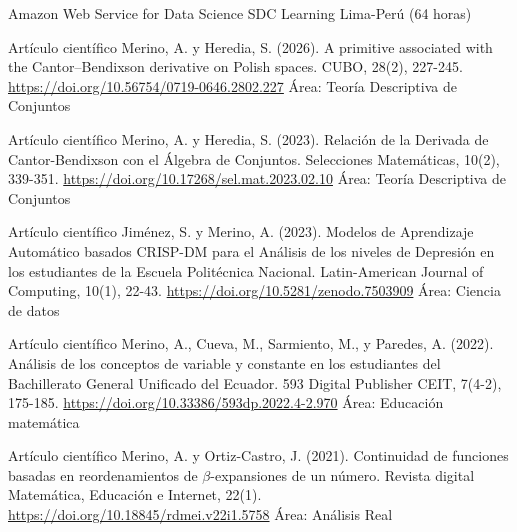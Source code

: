 \documentclass[
    a4paper,
    maincolor=cvblue!70!blue,
    sidecolor=gray!30,
    sectioncolor=cvblue!70!blue,
    sidebarwidth=7.5cm,
    topbottommargin=20pt,
    leftrightmargin=20pt,
]{fortysecondscv}
\begin{document}
    {Amazon Web Service for Data Science}
    {SDC Learning}
    {Lima-Perú (64 horas)}





    {Artículo científico}
    {Merino, A. y Heredia, S. (2026). A primitive associated with the Cantor–Bendixson derivative on Polish spaces. CUBO, 28(2), 227-245.}
    {\url{https://doi.org/10.56754/0719-0646.2802.227}}
    {Área: Teoría Descriptiva de Conjuntos}

    {Artículo científico}
    {Merino, A. y Heredia, S. (2023). Relación de la Derivada de Cantor-Bendixson con el Álgebra de Conjuntos. Selecciones Matemáticas, 10(2), 339-351.}
    {\url{https://doi.org/10.17268/sel.mat.2023.02.10}}
    {Área: Teoría Descriptiva de Conjuntos}
    
    {Artículo científico}
    {Jiménez, S. y Merino, A. (2023). Modelos de Aprendizaje Automático basados CRISP-DM para el Análisis de los niveles de Depresión en los estudiantes de la Escuela Politécnica Nacional. Latin-American Journal of Computing, 10(1), 22-43.}     
    {\url{https://doi.org/10.5281/zenodo.7503909}}
    {Área: Ciencia de datos}
    
    {Artículo científico}
    {Merino, A., Cueva, M., Sarmiento, M., y Paredes, A. (2022). Análisis de los conceptos de variable y constante en los estudiantes del Bachillerato General Unificado del Ecuador. 593 Digital Publisher CEIT, 7(4-2), 175-185.}     
    {\url{https://doi.org/10.33386/593dp.2022.4-2.970}}
    {Área: Educación matemática}
    
    {Artículo científico}
    {Merino, A. y Ortiz-Castro, J. (2021). Continuidad de funciones basadas en reordenamientos de $\beta$-expansiones de un número. Revista digital Matemática, Educación e Internet, 22(1).}     
    {\url{https://doi.org/10.18845/rdmei.v22i1.5758}}
    {Área: Análisis Real}
    
\end{document}
